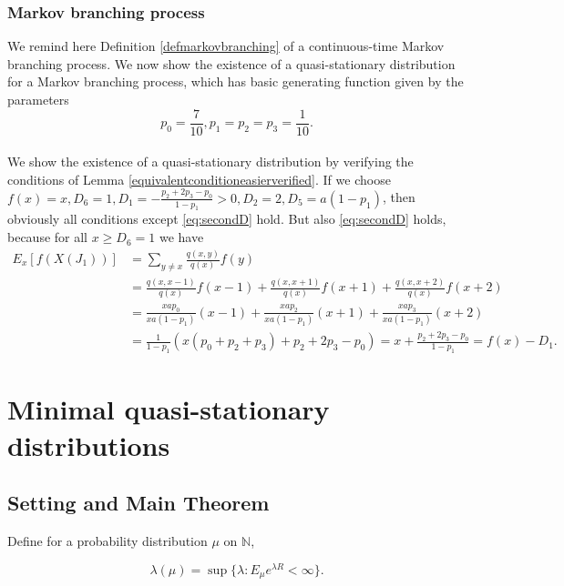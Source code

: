 \documentclass[12pt,a4paper]{scrartcl}
\numberwithin{equation}{section}
\newcommand{\N}{\mathbb{N}} %
\begin{document}
\subsubsection{Markov branching process}

We remind here Definition \ref{defmarkovbranching} of a continuous-time Markov branching process. We now show the existence of a quasi-stationary distribution for a Markov branching process, which has basic generating function given by the parameters
$$ p_0 = \frac{7}{10}, p_1 = p_2 = p_3 = \frac{1}{10}. $$
\\[2em]
We show the existence of a quasi-stationary distribution by verifying the conditions of Lemma \ref{equivalentconditioneasierverified}. If we choose $f\left(x\right)= x, D_6 = 1, D_1 = - \frac{p_2 + 2p_3 - p_0}{1-p_1} > 0, D_2 = 2, D_5 = a\left(1-p_1\right)$, then obviously all conditions except \eqref{eq:secondD} hold. But also \eqref{eq:secondD} holds, because for all $ x \geq D_6 = 1 $ we have
\begin{align*}
E_x\left[f\left(X\left(J_1\right)\right)\right] &= \sum_{y \neq x} \frac{q\left(x,y\right)}{q\left(x\right)} f\left(y\right) \\
&= \frac{q\left(x,x-1\right)}{q\left(x\right)} f\left(x-1\right) + \frac{q\left(x,x+1\right)}{q\left(x\right)} f\left(x+1\right) + \frac{q\left(x,x+2\right)}{q\left(x\right)} f\left(x+2\right) \\
&= \frac{xap_0}{xa\left(1-p_1\right)} \left(x-1\right) + \frac{xap_2}{xa\left(1-p_1\right)} \left(x+1\right) + \frac{xa p_3}{xa\left(1-p_1\right)} \left(x+2\right) \\
&=\frac{1}{1-p_1} \left(x \left(p_0 + p_2 + p_3\right) + p_2 + 2p_3 -p_0 \right) = x + \frac{p_2 + 2p_3 -p_0}{1-p_1} = f\left(x\right)-D_1.
\end{align*}


\section{Minimal quasi-stationary distributions}

\subsection{Setting and Main Theorem}

Define for a probability distribution $\mu$ on $\N$,

\begin{equation}
\lambda\left(\mu\right) = \sup\lbrace \lambda : E_{\mu} e^{\lambda R} < \infty \rbrace .
\end{equation}
\end{document}
